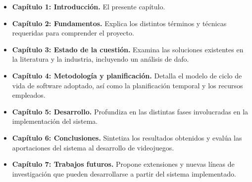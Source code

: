 \begin{itemize}
    \item \textbf{Capítulo 1: Introducción.} El presente capítulo.
    \item \textbf{Capítulo 2: Fundamentos.} Explica los distintos términos y técnicas requeridas para comprender el proyecto.
    \item \textbf{Capítulo 3: Estado de la cuestión.} Examina las soluciones existentes en la literatura y la industria, incluyendo un análisis de \acrfull{dafo}.
    \item \textbf{Capítulo 4: Metodología y planificación.} Detalla el modelo de ciclo de vida de software adoptado, así como la planificación temporal y los recursos empleados.
    \item \textbf{Capítulo 5: Desarrollo.} Profundiza en las distintas fases involucradas en la implementación del sistema.
    \item \textbf{Capítulo 6: Conclusiones.} Sintetiza los resultados obtenidos y evalúa las aportaciones del sistema al desarrollo de videojuegos.
    \item \textbf{Capítulo 7: Trabajos futuros.} Propone extensiones y nuevas líneas de investigación que pueden desarrollarse a partir del sistema implementado.
\end{itemize}
